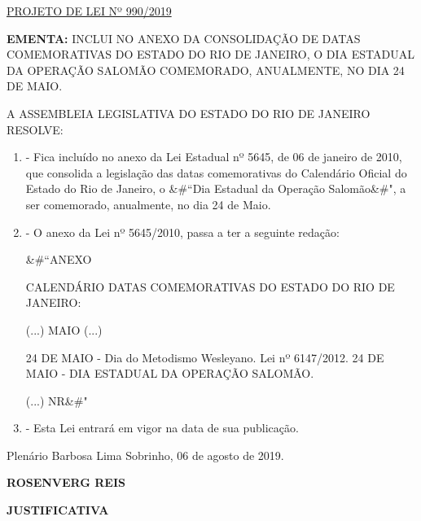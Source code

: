 \documentclass[10pt]{article}
\date{}
\begin{document}
\maketitle
\begin{center}
  \huge
  \vspace{-3cm}\href{http://alerjln1.alerj.rj.gov.br/scpro1923.nsf/f4b46b3cdbba990083256cc900746cf6/5beb39e2577b54738325844e004db19d?OpenDocument}{PROJETO DE LEI Nº 990/2019}
\bigskip
\bigskip
\bigskip
  
\end{center}

\textbf{EMENTA:} 
INCLUI NO ANEXO DA CONSOLIDAÇÃO DE DATAS COMEMORATIVAS DO ESTADO DO RIO DE JANEIRO, O DIA ESTADUAL  DA OPERAÇÃO SALOMÃO COMEMORADO, ANUALMENTE, NO DIA 24 DE MAIO. 








\bigskip

\noindent
A ASSEMBLEIA LEGISLATIVA DO ESTADO DO RIO DE JANEIRO RESOLVE:

\begin{enumerate}[label=Art. \arabic*\textdegree]
\item - Fica incluído no anexo da Lei Estadual nº 5645, de 06 de janeiro de 2010, que consolida a legislação das datas comemorativas do Calendário Oficial do Estado do Rio de Janeiro, o &#``Dia Estadual da Operação Salomão&#", a ser comemorado, anualmente, no dia 24 de Maio.

\item - O anexo da Lei nº 5645/2010, passa a ter a seguinte redação:

&#``ANEXO

CALENDÁRIO DATAS COMEMORATIVAS DO ESTADO DO RIO DE JANEIRO:

(...)
MAIO
(...)

24 DE MAIO - Dia do Metodismo Wesleyano. Lei nº 6147/2012. 
24 DE MAIO - DIA ESTADUAL DA OPERAÇÃO SALOMÃO.

(...) NR&#"



\item - Esta Lei entrará em vigor na data de sua publicação.



\end{enumerate}




\begin{center}
  Plenário Barbosa Lima Sobrinho, 06 de agosto de 2019.

   \bigskip

  \textbf{ ROSENVERG REIS}

  \bigskip

  \textbf{JUSTIFICATIVA}
  \bigskip

\end{center}
\end{document}
